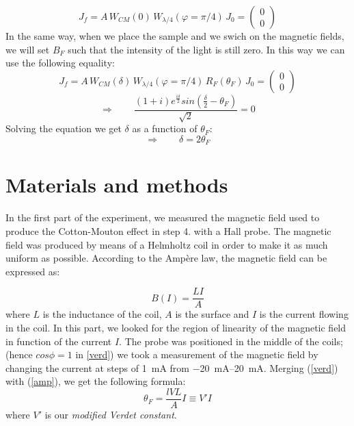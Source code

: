 \documentclass[11pt,a4paper]{article}
\begin{document}
\begin{equation*}
J_f=A\,W_{CM}(0)\,W_{\lambda/4}(\varphi=\pi/4)\,J_0=
\begin{pmatrix}
0\\0
\end{pmatrix}
\end{equation*}
In the same way, when we place the sample and we swich on the magnetic fields, we will set $B_F$ such that the intensity of the light is still zero. In this way we can use the following equality:
\begin{equation*}
J_f=A\,W_{CM}(\delta)\,W_{\lambda/4}(\varphi=\pi/4)\, R_F(\theta_F)\,J_0=
\begin{pmatrix}
0\\0
\end{pmatrix}
\end{equation*}
\begin{equation*}
\Rightarrow\qquad \frac{(1+i)e^{\frac{i\delta}{2}}sin\left( \frac{\delta}{2}-\theta_F\right) }{\sqrt{2}}=0
\end{equation*}
Solving the equation we get $\delta$ as a function of $\theta_F$:
\begin{equation}\label{eq:rel_optical_phase_angle}
\Rightarrow \qquad \delta=2\theta_F
\end{equation}

\section{Materials and methods}\label{mm}
In the first part of the experiment, we measured the magnetic field used to produce the Cotton-Mouton effect in step 4. with a Hall probe. The magnetic field was produced by means of a Helmholtz coil in order to make it as much uniform as possible. According to the Ampère law, the magnetic field can be expressed as:

\begin{equation}
B(I)=\frac{LI}{A}\label{amp}
\end{equation}
where $L$ is the inductance of the coil, $A$ is the surface and $I$ is the current flowing in the coil. In this part, we looked for the region of linearity of the magnetic field in function of the current $I$. The probe was positioned in the middle of the coils; (hence $cos\phi=1$ in \ref{verd}) we took a measurement of the magnetic field by changing the current at steps of \SI{1}{\mA} from \SIrange{-20}{+20}{\mA}. Merging (\ref{verd}) with (\ref{amp}), we get the following formula:
\begin{equation}
\theta_F=\frac{lVL}{A}I\equiv V'I\label{modverd}
\end{equation} where $V'$ is our \emph{modified Verdet constant}.
\end{document}
